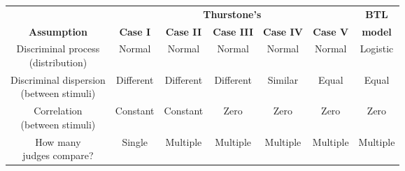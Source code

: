 \documentclass[border=3mm, varwidth=500mm]{standalone}
\begin{document}
\centering
\begin{table}[h!]
    \begin{center}
    \begin{tabular}{ccccccc}
        & \multicolumn{5}{c}{ \textbf{Thurstone's} } & \textbf{BTL} \\
        \cline{2-6}
        \textbf{Assumption} & \textbf{Case I} & \textbf{Case II} & \textbf{Case III} & \textbf{Case IV} & \textbf{Case V} & \textbf{model} \\
        \hline
        
        \rowcolor{gray.95} \Centerstack{ Discriminal process \\ (distribution) } & Normal & Normal & Normal & Normal & Normal & Logistic \\
        
        \Centerstack{ Discriminal dispersion \\ (between stimuli) } & Different & Different & Different & Similar & Equal & Equal \\

        \rowcolor{gray.95} \Centerstack{ Correlation \\ (between stimuli) } & Constant & Constant & Zero & Zero & Zero & Zero \\

        \Centerstack{ How many \\ judges compare? } & Single & Multiple & Multiple & Multiple & Multiple & Multiple \\

         
    \end{tabular}
    \end{center}
\end{table}
\end{document}
